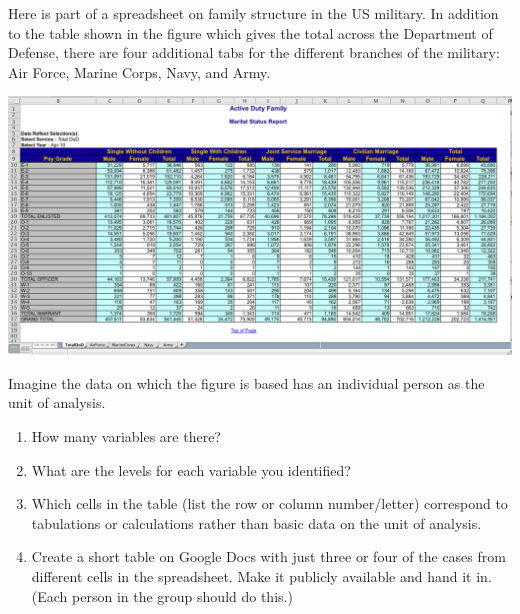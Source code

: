 
Here is part of a spreadsheet on family structure in the US military.  In addition to the table shown in the figure which gives the total across the Department of Defense, there are four additional tabs  for the different branches of the military: Air Force, Marine Corps, Navy, and Army.

\bigskip

\centerline{\includegraphics[width=7.5in]{active-duty.png}}

\bigskip

Imagine the data on which the figure is based has an individual person as the unit of analysis.
\begin{enumerate}
\item How many variables are there? 
\item What are the levels for each variable you identified?
\item Which cells in the table (list the row or column number/letter) correspond to tabulations or calculations rather than basic data on the unit of analysis.
\item  Create a short table on Google Docs with just three or four of the cases from different cells in the spreadsheet. Make it publicly available and hand it in.  (Each person in the group should do this.)
\end{enumerate} 
 